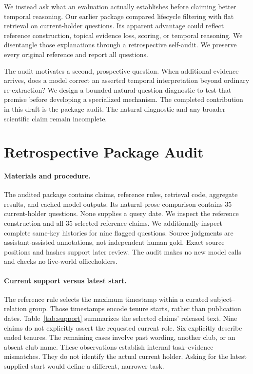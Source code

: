\documentclass[11pt]{article}
\begin{document}
We instead ask what an evaluation actually establishes before claiming better temporal reasoning.
Our earlier package compared lifecycle filtering with flat retrieval on current-holder questions.
Its apparent advantage could reflect reference construction, topical evidence loss, scoring, or temporal reasoning.
We disentangle those explanations through a retrospective self-audit.
We preserve every original reference and report all questions.

The audit motivates a second, prospective question.
When additional evidence arrives, does a model correct an asserted temporal interpretation beyond ordinary re-extraction?
We design a bounded natural-question diagnostic to test that premise before developing a specialized mechanism.
The completed contribution in this draft is the package audit.
The natural diagnostic and any broader scientific claim remain incomplete.

\section{Retrospective Package Audit}
\label{sec:audit}

\paragraph{Materials and procedure.}
The audited package contains claims, reference rules, retrieval code, aggregate results, and cached model outputs.
Its natural-prose comparison contains 35 current-holder questions.
None supplies a query date.
We inspect the reference construction and all 35 selected reference claims.
We additionally inspect complete same-key histories for nine flagged questions.
Source judgments are assistant-assisted annotations, not independent human gold.
Exact source positions and hashes support later review.
The audit makes no new model calls and checks no live-world officeholders.

\paragraph{Current support versus latest start.}
The reference rule selects the maximum timestamp within a curated subject--relation group.
Those timestamps encode tenure starts, rather than publication dates.
Table~\ref{tab:support} summarizes the selected claims' released text.
Nine claims do not explicitly assert the requested current role.
Six explicitly describe ended tenures.
The remaining cases involve past wording, another club, or an absent club name.
These observations establish internal task--evidence mismatches.
They do not identify the actual current holder.
Asking for the latest supplied start would define a different, narrower task.
\end{document}
